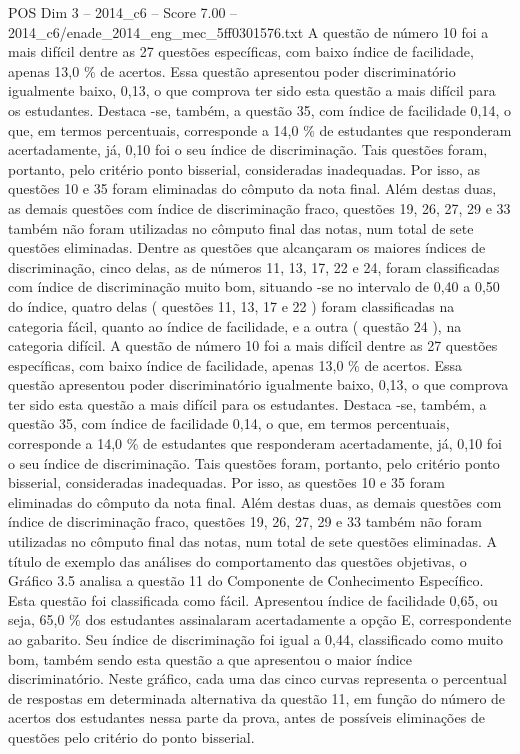\begin{textsample}{POS Dim 3 – 2014\_c6 – Score 7.00 – 2014\_c6/enade\_2014\_eng\_mec\_5ff0301576.txt}
A questão de número 10 foi a mais difícil dentre as 27 questões específicas, com baixo índice de facilidade, apenas 13,0 \% de acertos.
Essa questão apresentou poder discriminatório igualmente baixo, 0,13, o que comprova ter sido esta questão a mais difícil para os estudantes.
Destaca -se, também, a questão 35, com índice de facilidade 0,14, o que, em termos percentuais, corresponde a 14,0 \% de estudantes que responderam acertadamente, já, 0,10 foi o seu índice de discriminação.
Tais questões foram, portanto, pelo critério ponto bisserial, consideradas inadequadas.
Por isso, as questões 10 e 35 foram eliminadas do cômputo da nota final.
Além destas duas, as demais questões com índice de discriminação fraco, questões 19, 26, 27, 29 e 33 também não foram utilizadas no cômputo final das notas, num total de sete questões eliminadas.
Dentre as questões que alcançaram os maiores índices de discriminação, cinco delas, as de números 11, 13, 17, 22 e 24, foram classificadas com índice de discriminação muito bom, situando -se no intervalo de 0,40 a 0,50 do índice, quatro delas ( questões 11, 13, 17 e 22 ) foram classificadas na categoria fácil, quanto ao índice de facilidade, e a outra ( questão 24 ), na categoria difícil.
A questão de número 10 foi a mais difícil dentre as 27 questões específicas, com baixo índice de facilidade, apenas 13,0 \% de acertos.
Essa questão apresentou poder discriminatório igualmente baixo, 0,13, o que comprova ter sido esta questão a mais difícil para os estudantes.
Destaca -se, também, a questão 35, com índice de facilidade 0,14, o que, em termos percentuais, corresponde a 14,0 \% de estudantes que responderam acertadamente, já, 0,10 foi o seu índice de discriminação.
Tais questões foram, portanto, pelo critério ponto bisserial, consideradas inadequadas.
Por isso, as questões 10 e 35 foram eliminadas do cômputo da nota final.
Além destas duas, as demais questões com índice de discriminação fraco, questões 19, 26, 27, 29 e 33 também não foram utilizadas no cômputo final das notas, num total de sete questões eliminadas.
A título de exemplo das análises do comportamento das questões objetivas, o Gráfico 3.5 analisa a questão 11 do Componente de Conhecimento Específico.
Esta questão foi classificada como fácil.
Apresentou índice de facilidade 0,65, ou seja, 65,0 \% dos estudantes assinalaram acertadamente a opção E, correspondente ao gabarito.
Seu índice de discriminação foi igual a 0,44, classificado como muito bom, também sendo esta questão a que apresentou o maior índice discriminatório.
Neste gráfico, cada uma das cinco curvas representa o percentual de respostas em determinada alternativa da questão 11, em função do número de acertos dos estudantes nessa parte da prova, antes de possíveis eliminações de questões pelo critério do ponto bisserial.

\end{textsample}
